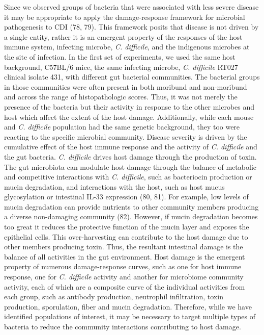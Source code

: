 \documentclass[
  12pt,
]{article}
\begin{document}
Since we observed groups of bacteria that were associated with less
severe disease it may be appropriate to apply the damage-response
framework for microbial pathogenesis to CDI (78, 79). This framework
posits that disease is not driven by a single entity, rather it is an
emergent property of the responses of the host immune system, infecting
microbe, \emph{C. difficile}, and the indigenous microbes at the site of
infection. In the first set of experiments, we used the same host
background, C57BL/6 mice, the same infecting microbe, \emph{C.
difficile} RT027 clinical isolate 431, with different gut bacterial
communities. The bacterial groups in those communities were often
present in both moribund and non-moribund and across the range of
histopathologic scores. Thus, it was not merely the presence of the
bacteria but their activity in response to the other microbes and host
which affect the extent of the host damage. Additionally, while each
mouse and \emph{C. difficile} population had the same genetic
background, they too were reacting to the specific microbial community.
Disease severity is driven by the cumulative effect of the host immune
response and the activity of \emph{C. difficile} and the gut bacteria.
\emph{C. difficile} drives host damage through the production of toxin.
The gut microbiota can modulate host damage through the balance of
metabolic and competitive interactions with \emph{C. difficile}, such as
bacteriocin production or mucin degradation, and interactions with the
host, such as host mucus glycosylation or intestinal IL-33 expression
(80, 81). For example, low levels of mucin degradation can provide
nutrients to other community members producing a diverse non-damaging
community (82). However, if mucin degradation becomes too great it
reduces the protective function of the mucin layer and exposes the
epithelial cells. This over-harvesting can contribute to the host damage
due to other members producing toxin. Thus, the resultant intestinal
damage is the balance of all activities in the gut environment. Host
damage is the emergent property of numerous damage-response curves, such
as one for host immune response, one for \emph{C. difficile} activity
and another for microbiome community activity, each of which are a
composite curve of the individual activities from each group, such as
antibody production, neutrophil infiltration, toxin production,
sporulation, fiber and mucin degradation. Therefore, while we have
identified populations of interest, it may be necessary to target
multiple types of bacteria to reduce the community interactions
contributing to host damage.
\end{document}
